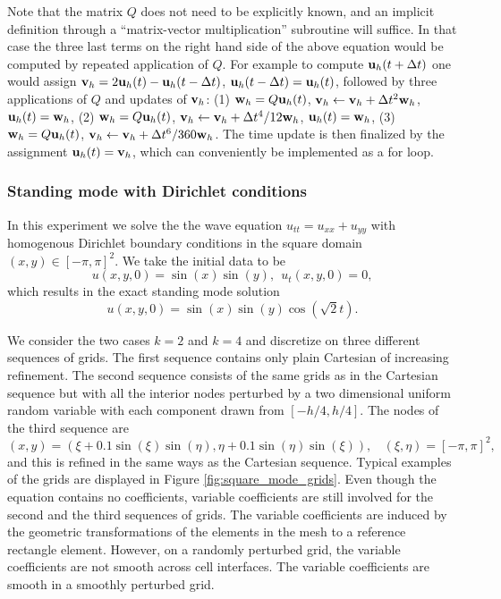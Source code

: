 \documentclass[onefignum,onetabnum]{siamart171218}
\begin{document}
 Note that the matrix $Q$ does not need to be explicitly known, and an implicit definition through a ``matrix-vector multiplication'' subroutine will suffice. In that case the three last terms on the right hand side of the above equation would be computed by repeated application of $Q$. For example to compute ${\bf u}_h(t+\Delta t)$ one would assign ${\bf v}_h = 2{\bf u}_h(t)-{\bf u}_h(t-\Delta t)$, ${\bf u}_h(t-\Delta t) = {\bf u}_h(t)$, followed by three applications of $Q$ and updates of ${\bf v}_h$: (1) ${\bf w}_h = Q {\bf u}_h(t)$, ${\bf v}_h \leftarrow {\bf v}_h +  \Delta t^2 {\bf w}_h$, ${\bf u}_h(t) = {\bf w}_h$, (2) ${\bf w}_h = Q {\bf u}_h(t)$, ${\bf v}_h \leftarrow {\bf v}_h +  \Delta t^4/12 {\bf w}_h$, ${\bf u}_h(t) = {\bf w}_h$, (3) ${\bf w}_h = Q {\bf u}_h(t)$, ${\bf v}_h \leftarrow {\bf v}_h +  \Delta t^6/360 {\bf w}_h$. The time update is then finalized by the assignment ${\bf u}_h(t) = {\bf v}_h$, which can conveniently be implemented as a for loop.  

\subsubsection{Standing mode with Dirichlet conditions} \label{sec:Dsquare_mode}


In this experiment we solve the the wave equation  $u_{tt}=u_{xx}+u_{yy}$  with homogenous Dirichlet boundary conditions in the square domain $(x,y) \in [-\pi,\pi]^2$. We take the initial data  to be 
\[
u(x,y,0) = \sin (x) \sin(y), \ \ u_t(x,y,0) = 0,
\] 
which results in the exact standing mode solution 
\[
u(x,y,0) = \sin (x) \sin(y) \cos(\sqrt{2}t).
\]

We consider the two cases $k = 2$ and $k=4$ and discretize on three different sequences of grids. The first sequence contains only plain Cartesian of increasing refinement. The second sequence consists of the same grids as in the Cartesian sequence but with all the interior nodes perturbed by a two dimensional uniform random variable with each component drawn from $[-h/4,h/4]$. The nodes of the third sequence are 
\[
(x,y) =  (\xi + 0.1 \sin(\xi) \sin(\eta),\eta + 0.1 \sin(\eta) \sin(\xi)), \ \ \ \ (\xi,\eta) = [-\pi,\pi]^2,
\] 
and this is refined in the same ways as the Cartesian sequence. 
Typical examples of the grids are displayed in Figure \ref{fig:square_mode_grids}.
 Even though the equation contains no coefficients, 
variable coefficients are still involved for the second and the third sequences of grids. The variable coefficients are induced by the geometric transformations of the elements in the mesh to a reference rectangle element. However, on a randomly perturbed grid, the variable coefficients are not smooth across cell interfaces. The variable coefficients are smooth in a smoothly perturbed grid.  
\end{document}
